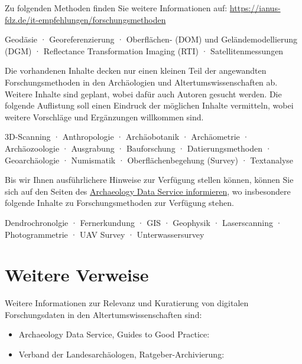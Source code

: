 \documentclass[a4paper]{report}
\begin{document}
Zu folgenden Methoden finden Sie weitere Informationen auf: \url{https://ianus-fdz.de/it-empfehlungen/forschungsmethoden}

Geodäsie · Georeferenzierung · Oberflächen- (DOM) und Geländemodellierung (DGM) · Reflectance Transformation Imaging (RTI) · Satellitenmessungen

Die vorhandenen Inhalte decken nur einen kleinen Teil der angewandten Forschungsmethoden in den Archäologien und Altertumswissenschaften ab. Weitere Inhalte sind geplant, wobei dafür auch Autoren gesucht werden. Die folgende Auflistung soll einen Eindruck der möglichen Inhalte vermitteln, wobei weitere Vorschläge und Ergänzungen willkommen sind.

3D-Scanning · Anthropologie · Archäobotanik · Archäometrie · Archäozoologie · Ausgrabung · Bauforschung · Datierungsmethoden · Geoarchäologie · Numismatik · Oberflächenbegehung (Survey) · Textanalyse

Bis wir Ihnen ausführlichere Hinweise zur Verfügung stellen können, können Sie sich auf den Seiten des \href{http://guides.archaeologydataservice.ac.uk/g2gp}{Archaeology Data Service informieren}, wo insbesondere folgende Inhalte zu Forschungsmethoden zur Verfügung stehen.

Dendrochronolgie · Fernerkundung · GIS · Geophysik · Laserscanning · Photogrammetrie · UAV Survey · Unterwassersurvey


\section{Weitere Verweise}
Weitere Informationen zur Relevanz und Kuratierung von digitalen Forschungsdaten in den Altertumswissenschaften sind:
\begin{itemize}
	\item Archaeology Data Service, Guides to Good Practice:  \vspace{-0.5cm}
	\item Verband der Landesarchäologen, Ratgeber-Archivierung: 
\end{itemize}
\end{document}
